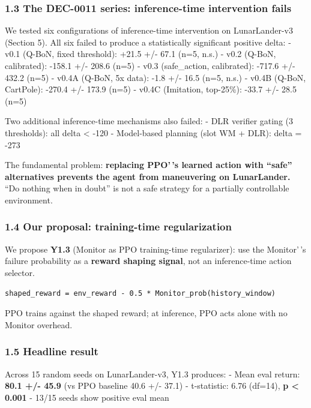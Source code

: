 \documentclass[
]{article}
\begin{document}
\subsubsection{1.3 The DEC-0011 series: inference-time intervention
fails}\label{the-dec-0011-series-inference-time-intervention-fails}

We tested six configurations of inference-time intervention on
LunarLander-v3 (Section 5). All six failed to produce a statistically
significant positive delta: - v0.1 (Q-BoN, fixed threshold): +21.5 +/-
67.1 (n=5, n.s.) - v0.2 (Q-BoN, calibrated): -158.1 +/- 208.6 (n=5) -
v0.3 (safe\_action, calibrated): -717.6 +/- 432.2 (n=5) - v0.4A (Q-BoN,
5x data): -1.8 +/- 16.5 (n=5, n.s.) - v0.4B (Q-BoN, CartPole): -270.4
+/- 173.9 (n=5) - v0.4C (Imitation, top-25\%): -33.7 +/- 28.5 (n=5)

Two additional inference-time mechanisms also failed: - DLR verifier
gating (3 thresholds): all delta \textless{} -120 - Model-based planning
(slot WM + DLR): delta = -273

The fundamental problem: \textbf{replacing PPO'\,'s learned action with
``safe'' alternatives prevents the agent from maneuvering on
LunarLander.} ``Do nothing when in doubt'' is not a safe strategy for a
partially controllable environment.

\subsubsection{1.4 Our proposal: training-time
regularization}\label{our-proposal-training-time-regularization}

We propose \textbf{Y1.3} (Monitor as PPO training-time regularizer): use
the Monitor'\,'s failure probability as a \textbf{reward shaping
signal}, not an inference-time action selector.

\begin{verbatim}
shaped_reward = env_reward - 0.5 * Monitor_prob(history_window)
\end{verbatim}

PPO trains against the shaped reward; at inference, PPO acts alone with
no Monitor overhead.

\subsubsection{1.5 Headline result}\label{headline-result}

Across 15 random seeds on LunarLander-v3, Y1.3 produces: - Mean eval
return: \textbf{80.1 +/- 45.9} (vs PPO baseline 40.6 +/- 37.1) -
t-statistic: 6.76 (df=14), \textbf{p \textless{} 0.001} - 13/15 seeds
show positive eval mean
\end{document}
